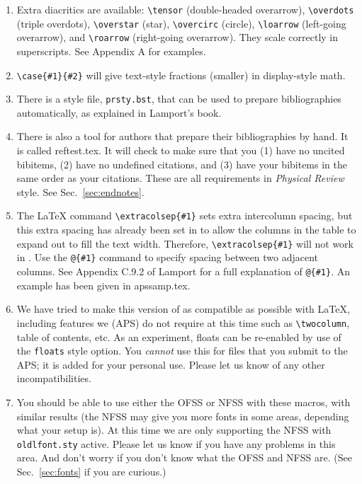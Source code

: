 \begin{enumerate}
\item Extra diacritics are available: \verb+\tensor+ (double-headed
overarrow), \verb+\overdots+ (triple overdots), \verb+\overstar+ (star),
\verb+\overcirc+ (circle), \verb+\loarrow+ (left-going overarrow), and
\verb+\roarrow+ (right-going overarrow). They scale correctly in
superscripts. See Appendix A for examples.

\item \verb+\case{#1}{#2}+ will give text-style fractions (smaller) in
display-style math.

\item There is a \BibTeX{} style file, \verb+prsty.bst+, that can be used
to prepare bibliographies automatically, as explained in Lamport's book.

\item There is also a tool for authors that prepare their bibliographies by
hand. It is called reftest.tex. It will check to make sure that you (1)
have no uncited bibitems, (2) have no undefined citations, and (3) have
your bibitems in the same order as your citations. These are all
requirements in {\it Physical Review\/} style. See Sec.\
\ref{sec:endnotes}.

\item The \LaTeX{} command \verb+\extracolsep{#1}+ sets extra intercolumn
spacing, but this extra spacing has already been set in \REVTeX{} to allow
the columns in the table to expand out to fill the text width. Therefore,
\verb+\extracolsep{#1}+ will not work in \REVTeX{}. Use the \verb+@{#1}+
command to specify spacing between two adjacent columns. See Appendix C.9.2
of Lamport for a full explanation of \verb+@{#1}+. An example has been
given in apssamp.tex.

\item We have tried to make this version of \REVTeX{} as compatible as
possible with \LaTeX{}, including features we (APS) do not require at this
time such as \verb+\twocolumn+, table of contents, etc. As an experiment,
floats can be re-enabled by use of the \verb+floats+ style option. You {\em
cannot\/} use this for files that you submit to the APS; it is added for
your personal use. Please let us know of any other incompatibilities.

\item You should be able to use either the OFSS or NFSS with these macros,
with similar results (the NFSS may give you more fonts in some areas,
depending what your setup is). At this time we are only supporting the NFSS
with \verb+oldlfont.sty+ active. Please let us know if you have any
problems in this area. And don't worry if you don't know what the OFSS and
NFSS are. (See Sec.\ \ref{sec:fonts} if you are curious.) \end{enumerate}



